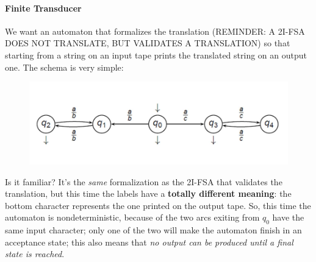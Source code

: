 				\paragraph{Finite Transducer}
					We want an automaton that formalizes the translation (REMINDER: A 2I-FSA DOES NOT TRANSLATE, BUT VALIDATES A TRANSLATION) so that starting from a string on an input tape prints the translated string on an output one. The schema is very simple:
					\begin{figure}[H]
						\centering
						\includegraphics[width = \textwidth]{./images/2IFSA.png}
					\end{figure}
					Is it familiar? It's the \emph{same} formalization as the 2I-FSA that validates the translation, but this time the labels have a \textbf{totally different meaning}: the bottom character represents the one printed on the output tape. So, this time the automaton is nondeterministic, because of the two arcs exiting from $q_0$ have the same input character; only one of the two will make the automaton finish in an acceptance state; this also means that \emph{no output can be produced until a final state is reached}.
					
